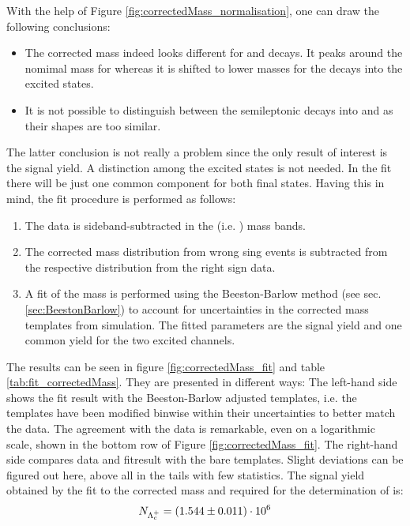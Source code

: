 With the help of Figure \ref{fig:correctedMass_normalisation}, one can draw the following conclusions:
\begin{itemize}
    \item The corrected \pKpi\mun mass indeed looks different for \LbToLcmunu and \decay{\Lb}{\Lcstar\mun\neumb} decays.
          It peaks around the nomimal \Lb mass for \LbToLcmunu whereas it is shifted to lower masses for the decays into the excited \Lcstar states. 
    \item It is not possible to distinguish between the semileptonic \Lb decays into  and  as their shapes are too similar.
\end{itemize}
The latter conclusion is not really a problem since the only result of interest is the \LbToLcmunu signal yield. 
A distinction among the excited states is not needed.
In the fit there will be just one common component for both final states.
Having this in mind, the fit procedure is performed as follows:
\begin{enumerate}
    \item The data is sideband-subtracted in the \pKpi (i.e. \Lc) mass bands.
    \item The corrected \pKpi\mun mass distribution from wrong sing events is subtracted from the respective distribution from the right sign data.
    \item A fit of the \pKpi\mun mass is performed using the Beeston-Barlow method (see sec. \ref{sec:BeestonBarlow}) to account for uncertainties in the corrected mass templates from simulation. The fitted parameters are the \Lc signal yield and one common yield for the two excited \Lcstar channels.
\end{enumerate}
The results can be seen in figure \ref{fig:correctedMass_fit} and table \ref{tab:fit_correctedMass}. 
They are presented in different ways:
The left-hand side shows the fit result with the Beeston-Barlow adjusted templates, i.e. the templates have been modified binwise within their uncertainties to better match the data.
The agreement with the data is remarkable, even on a logarithmic scale, shown in the bottom row of Figure \ref{fig:correctedMass_fit}.
The right-hand side compares data and fitresult with the bare templates.
Slight deviations can be figured out here, above all in the tails with few statistics.
The \LbToLcmunu signal yield \NLc obtained by the fit to the corrected \pKpi\mun mass and required for the determination of \R is:
\begin{align*}
    N_{{{\Lambda}^+_{c}}} = (1.544 \pm 0.011)\cdot 10^{6}
\end{align*}

